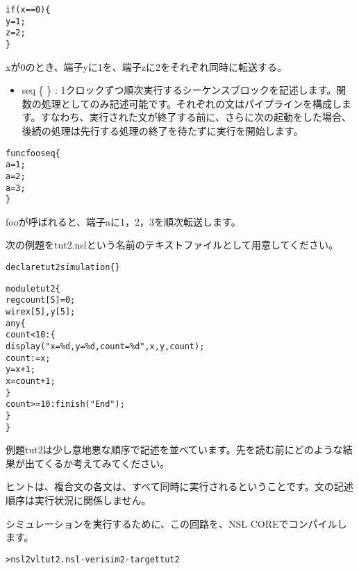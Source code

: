 \begin{reviewemlist}
\begin{alltt}
if(x==0) \{
   y=1;
   z=2;
\}
\end{alltt}
\end{reviewemlist}

xが0のとき、端子yに1を、端子zに2をそれぞれ同時に転送する。

\begin{itemize}
\item seq \{ \} : 1クロックずつ順次実行するシーケンスブロックを記述します。関数の処理としてのみ記述可能です。それぞれの文はパイプラインを構成します。すなわち、実行された文が終了する前に、さらに次の起動をした場合、後続の処理は先行する処理の終了を待たずに実行を開始します。
\end{itemize}

\begin{reviewemlist}
\begin{alltt}
func foo seq \{
   a=1;
   a=2;
   a=3;
\}
\end{alltt}
\end{reviewemlist}

fooが呼ばれると、端子aに1，2，3を順次転送します。

次の例題をtut2.nslという名前のテキストファイルとして用意してください。

\begin{reviewlist}
\begin{alltt}
declare tut2 simulation \{ \}

module tut2 \{
   reg count[5]=0;
   wire x[5],y[5];
   any \{
       count \textless{} 10 : \{
               \textunderscore{}display("x=\%d,y=\%d,count=\%d",x,y,count);
               count := x;
               y = x + 1;
               x = count + 1;
               \}
       count \textgreater{}= 10:    \textunderscore{}finish("End");
   \}
\}
\end{alltt}
\end{reviewlist}


例題tut2は少し意地悪な順序で記述を並べています。先を読む前にどのような結果が出てくるか考えてみてください。

ヒントは、複合文の各文は、すべて同時に実行されるということです。文の記述順序は実行状況に関係しません。

シミュレーションを実行するために、この回路を、NSL COREでコンパイルします。

\begin{reviewcmd}
\begin{alltt}
\textgreater{} nsl2vl tut2.nsl -verisim2 -target tut2
\end{alltt}
\end{reviewcmd}

